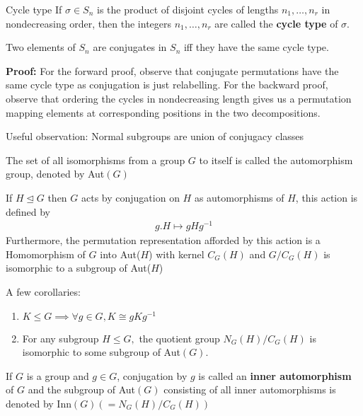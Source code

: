 \documentclass[titlepage, 12pt]{book}
\begin{document}
\begin{definition}{Cycle type}{}
    If $\sigma\in S_n$ is the product of disjoint cycles of lengths
    $n_1,\dots,n_r$ in nondecreasing order, then the integers $n_1,\dots,n_r$
    are called the \textbf{cycle type} of $\sigma$.
\end{definition}

\begin{proposition}{}{}
    Two elements of $S_n$ are conjugates in $S_n$ iff they have the same cycle
    type.
\end{proposition}
\textbf{Proof:} For the forward proof, observe that conjugate permutations have
the same cycle type as conjugation is just relabelling. For the backward proof,
observe that ordering the cycles in nondecreasing length gives us a permutation
mapping elements at corresponding positions in the two decompositions.

Useful observation: Normal subgroups are union of conjugacy classes

\begin{definition}{}{}
    The set of all isomorphisms from a group $G$ to itself is called the
    automorphism group, denoted by Aut$(G)$
\end{definition}

\begin{proposition}{}{}
    If $H\trianglelefteq G$ then $G$ acts by conjugation on $H$ as automorphisms
    of $H$, this action is defined by
    \begin{gather*}
        g.H\mapsto gHg^{-1}
    \end{gather*}
    Furthermore, the permutation representation afforded by this action is a
    Homomorphism of $G$ into Aut($H$) with kernel $C_G(H)$ and $G/C_G(H)$ is
    isomorphic to a subgroup of Aut($H$)
\end{proposition}
A few corollaries:
\begin{enumerate}
    \item $K\leq G\implies\forall g\in G, K\cong gKg^{-1}$
    \item For any subgroup $H\leq G,$ the quotient group $N_G(H)/C_G(H)$ is
        isomorphic to some subgroup of Aut$(G)$.
\end{enumerate}

\begin{definition}{}{}
    If $G$ is a group and $g\in G$, conjugation by $g$ is called an
    \textbf{inner automorphism} of $G$ and the subgroup of Aut$(G)$ consisting
    of all inner automorphisms is denoted by Inn$(G) (= N_G(H)/C_G(H))$
\end{definition}
\end{document}
